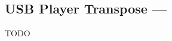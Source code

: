 \subsection[USB Player Transpose]{USB Player Transpose --- \UiKey{\SET}}








































TODO
